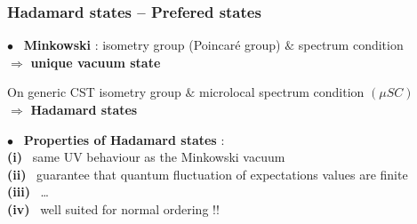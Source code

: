 \documentclass[9pt]{beamer}
\begin{document}

\begin{frame}

\frametitle{Hadamard states -- Prefered states}

\vfill

$\bullet$ \ \textbf{Minkowski} : isometry group (Poincaré group) $\&$  spectrum condition \\ 
\qquad $\Rightarrow$ \textbf{unique vacuum state} \\

\vfill

\begin{block}{On generic CST}
\vspace*{-6pt}
isometry group $\&$ microlocal spectrum condition $(\mu SC)$ \\
\qquad $\Rightarrow$ \textbf{Hadamard states} \\
\end{block}

\vfill

$\bullet$ \ \textbf{Properties of Hadamard states} : \\
%
\qquad \textbf{(i)} \ same UV behaviour as the Minkowski vacuum \\
%
\qquad \textbf{(ii)} \ guarantee that quantum fluctuation of expectations values are finite \\
%
\qquad \textbf{(iii)} \ \dots \\
%
\qquad \textbf{(iv)} \ well suited for normal ordering !!
%

\vfill

\end{frame}  

\end{document}
